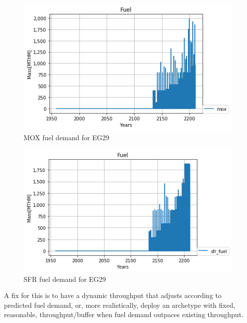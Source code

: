 \documentclass{article}
\begin{document}
\begin{figure}[htbp!]
	\begin{center}
		\includegraphics[scale=0.6]{./images/mox_fuel.png}
	\end{center}
	\caption{\gls{MOX} fuel demand for EG29}
	\label{fig:mox}
\end{figure}
\begin{figure}[htbp!]
	\begin{center}
		\includegraphics[scale=0.6]{./images/sfr_fuel.png}
	\end{center}
	\caption{\gls{SFR} fuel demand for EG29}
	\label{fig:sfr}
\end{figure}
\FloatBarrier

A fix for this is to have a dynamic throughput that adjusts according
to predicted fuel demand, or, more realistically, deploy an archetype with fixed, reasonable, throughput/buffer when fuel demand outpaces existing throughput.
\end{document}
